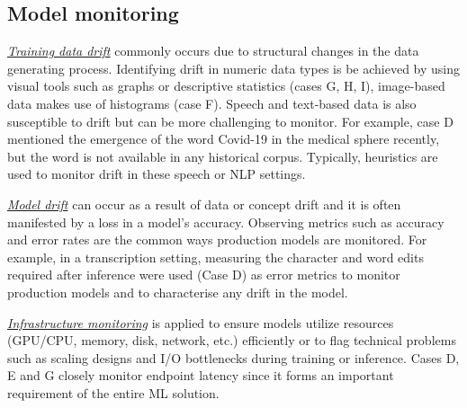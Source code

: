 \subsection{Model monitoring} 

\underline{\emph{Training data drift}} commonly occurs due to structural changes in the data generating process. Identifying drift in numeric data types is be achieved by using visual tools such as graphs or descriptive statistics (cases G, H, I), image-based data makes use of histograms (case F). Speech and text-based data is also susceptible to drift but can be more challenging to monitor. For example, case D mentioned the emergence of the word Covid-19 in the medical sphere recently, but the word is not available in any historical corpus. Typically, heuristics are used to monitor drift in these speech or NLP settings.

\underline{\emph{Model drift}} can occur as a result of data or concept drift and it is often manifested by a loss in a model's accuracy. Observing metrics such as accuracy and error rates are the common ways production models are monitored. For example, in a transcription setting, measuring the character and word edits required after inference were used (Case D) as error metrics to monitor production models and to characterise any drift in the model.

\underline{\emph{Infrastructure monitoring}}
is applied to ensure models utilize resources (GPU/CPU, memory, disk, network, etc.) efficiently or to flag technical problems such as scaling designs and I/O bottlenecks during training or inference. Cases D, E and G closely monitor endpoint latency since it forms an important requirement of the entire ML solution.


